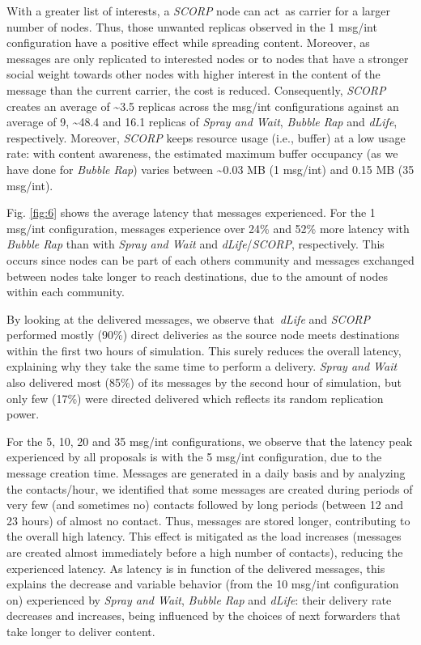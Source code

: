 \documentclass[lnicst]{svmultln}
\begin{document}
With a greater list of interests, a \emph{SCORP} node can act~as
carrier for a larger number of nodes. Thus, those unwanted replicas
observed in the 1 msg/int configuration have a positive effect while
spreading content. Moreover, as messages are only replicated to interested
nodes or to nodes that have a stronger social weight towards other
nodes with higher interest in the content of the message than the
current carrier, the cost is reduced. Consequently, \emph{SCORP} creates
an average of \textasciitilde{}3.5 replicas across the msg/int configurations
against an average of 9, \textasciitilde{}48.4 and 16.1 replicas of
\emph{Spray and Wait},\emph{ Bubble Rap} and \emph{dLife}, respectively.
Moreover, \emph{SCORP} keeps resource usage (i.e., buffer) at a low
usage rate: with content awareness, the estimated maximum buffer occupancy
(as we have done for \emph{Bubble Rap}) varies between \textasciitilde{}0.03
MB (1 msg/int) and 0.15 MB (35 msg/int).

Fig. \ref{fig:6} shows the average latency that messages experienced.
For the 1 msg/int configuration, messages experience over 24\% and
52\% more latency with \emph{Bubble Rap} than with \emph{Spray and
Wait }and \emph{dLife}/\emph{SCORP}, respectively. This occurs since
nodes can be part of each others community and messages exchanged
between nodes take longer to reach destinations, due to the amount
of nodes within each community. 

By looking at the delivered messages, we observe that\emph{~dLife}
and \emph{SCORP} performed mostly (90\%) direct deliveries as the
source node meets destinations within the first two hours of simulation.
This surely reduces the overall latency, explaining why they take
the same time to perform a delivery. \emph{Spray and Wait} also delivered
most (85\%) of its messages by the second hour of simulation, but
only few (17\%) were directed delivered which reflects its random
replication power.

For the 5, 10, 20 and 35 msg/int configurations, we observe that the
latency peak experienced by all proposals is with the 5 msg/int configuration,
due to the message creation time. Messages are generated in a daily
basis and by analyzing the contacts/hour, we identified that some
messages are created during periods of very few (and sometimes no)
contacts followed by long periods (between 12 and 23 hours) of almost
no contact. Thus, messages are stored longer, contributing to the
overall high latency. This effect is mitigated as the load increases
(messages are created almost immediately before a high number of contacts),
reducing the experienced latency. As latency is in function of the
delivered messages, this explains the decrease and variable behavior
(from the 10 msg/int configuration on) experienced by\emph{ Spray
and Wait}, \emph{Bubble Rap }and \emph{dLife}: their delivery rate
decreases and increases, being influenced by the choices of next forwarders
that take longer to deliver content.\emph{}
\end{document}
